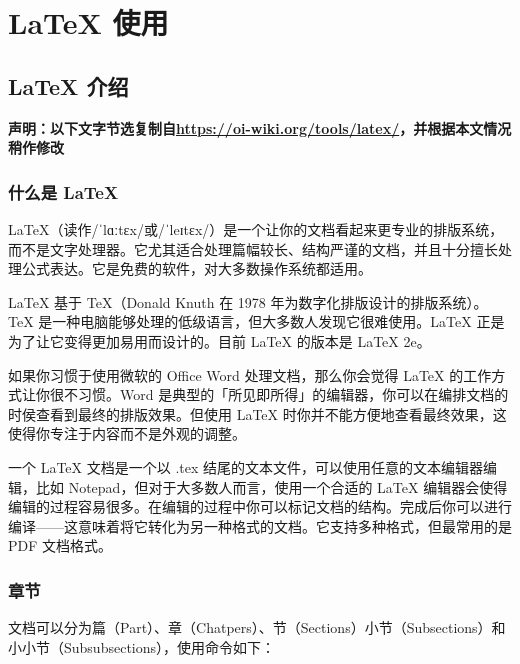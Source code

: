 
\part{\LaTeX{} 使用}

\chapter{\LaTeX{} 介绍}

\textbf{声明：以下文字节选复制自\url{https://oi-wiki.org/tools/latex/}，并根据本文情况稍作修改}

\section{什么是 \LaTeX{}}

LaTeX（读作/ˈlɑːtɛx/或/ˈleɪtɛx/）是一个让你的文档看起来更专业的排版系统，而不是文字处理器。它尤其适合处理篇幅较长、结构严谨的文档，并且十分擅长处理公式表达。它是免费的软件，对大多数操作系统都适用。

LaTeX 基于 TeX（Donald Knuth 在 1978 年为数字化排版设计的排版系统）。TeX 是一种电脑能够处理的低级语言，但大多数人发现它很难使用。LaTeX 正是为了让它变得更加易用而设计的。目前 LaTeX 的版本是 LaTeX 2e。

如果你习惯于使用微软的 Office Word 处理文档，那么你会觉得 LaTeX 的工作方式让你很不习惯。Word 是典型的「所见即所得」的编辑器，你可以在编排文档的时侯查看到最终的排版效果。但使用 LaTeX 时你并不能方便地查看最终效果，这使得你专注于内容而不是外观的调整。

一个 LaTeX 文档是一个以 .tex 结尾的文本文件，可以使用任意的文本编辑器编辑，比如 Notepad，但对于大多数人而言，使用一个合适的 LaTeX 编辑器会使得编辑的过程容易很多。在编辑的过程中你可以标记文档的结构。完成后你可以进行编译——这意味着将它转化为另一种格式的文档。它支持多种格式，但最常用的是 PDF 文档格式。

\section{章节}

文档可以分为篇（Part）、章（Chatpers）、节（Sections）小节（Subsections）和小小节（Subsubsections），使用命令如下：

